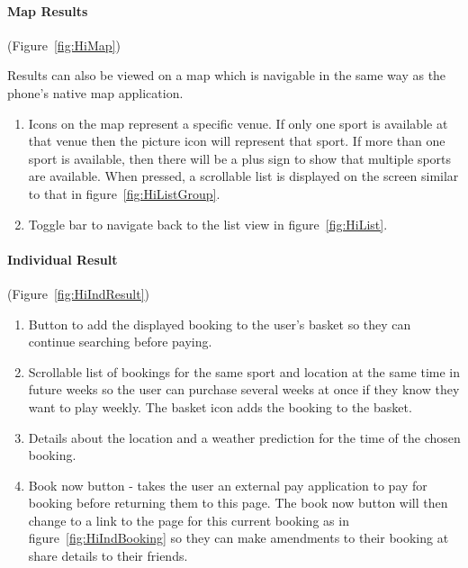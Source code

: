 \paragraph{Map Results}

(Figure~\ref{fig:HiMap})


Results can also be viewed on a map which is navigable in the same
way as the phone's native map application.
\begin{enumerate}
	\item Icons on the map represent a specific venue. If only one sport is
		available at that venue then the picture icon will represent that
		sport. If more than one sport is available, then there will be a plus
		sign to show that multiple sports are available. When pressed, a
		scrollable list is displayed on the screen similar to that in
		figure~\ref{fig:HiListGroup}.
	\item Toggle bar to navigate back to the list view in
		figure~\ref{fig:HiList}.
\end{enumerate}

\paragraph{Individual Result}

(Figure~\ref{fig:HiIndResult})

\begin{enumerate}
	\item Button to add the displayed booking to the user's basket so they can
		  continue searching before paying.
	\item Scrollable list of bookings for the same sport and location at the
		  same time in future weeks so the user can purchase several weeks at
		  once if they know they want to play weekly. The basket icon adds the
		  booking to the basket.
	\item Details about the location and a weather prediction for the time of
		  the chosen booking.
	\item Book now button - takes the user an external pay application to pay
		  for booking before returning them to this page. The book now button
		  will then change to a link to the page for this current booking as
		  in figure~\ref{fig:HiIndBooking} so they can make amendments to their
		  booking at share details to their friends.
\end{enumerate}

